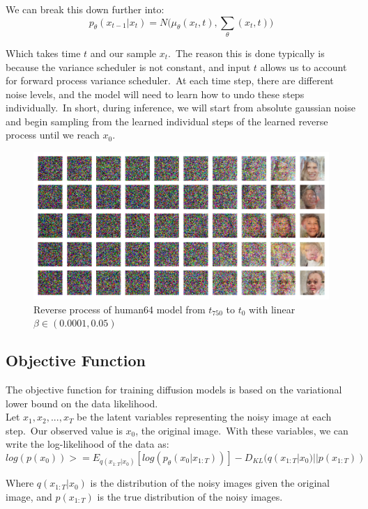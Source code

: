 \documentclass[12pt]{article}
\begin{document}
We can break this down further into:
\[{p_\theta }({x_{t - 1}}|{x_t}) = N({\mu _\theta }({x_t},t),\sum\limits_\theta  {({x_t},t))} \]

Which takes time $t$ and our sample $x_t$.\
The reason this is done typically is because the variance scheduler is not constant, and input $t$ allows us to account for forward process variance scheduler.\
At each time step, there are different noise levels, and the model will need to learn how to undo these steps individually.\
In short, during inference, we will start from absolute gaussian noise and begin sampling from the learned individual steps of the learned reverse process until we reach $x_0$.\

\begin{figure}[H]
  \centering
  \includegraphics[width=1\textwidth]{reverse3.png}
  \caption{Reverse process of human64 model from $t_{750}$ to $t_0$ with linear $\beta \in(0.0001, 0.05)$}
\end{figure}

\subsection{Objective Function}
The objective function for training diffusion models is based on the variational lower bound on the data likelihood.\\

Let ${x_1},{x_2},...,{x_T}$ be the latent variables representing the noisy image at each step.\
Our observed value is ${x_0}$, the original image.\
With these variables, we can write the log-likelihood of the data as:
\[log(p({x_0})) >= E_{q({x_{1:T}}|{x_0})} [log(p_{\theta}({x_0}|{x_{1:T}}))] - D_{KL}(q({x_{1:T}}|{x_0})||p({x_{1:T}}))\]

Where $q({x_{1:T}}|{x_0})$ is the distribution of the noisy images given the original image, and $p({x_{1:T}})$ is the true distribution of the noisy images.\\
\end{document}
